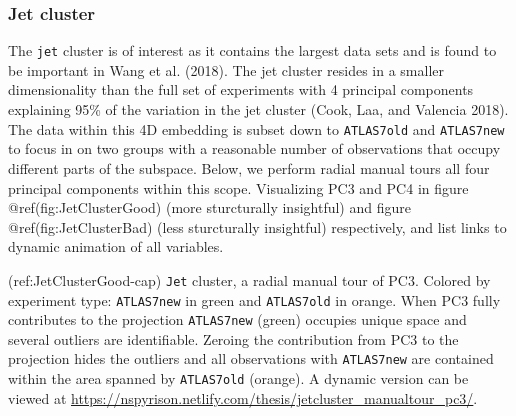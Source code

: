 \hypertarget{jet-cluster}{%
\subsubsection{Jet cluster}\label{jet-cluster}}

The \texttt{jet} cluster is of interest as it contains the largest data sets and is found to be important in Wang et al. (2018). The jet cluster resides in a smaller dimensionality than the full set of experiments with 4 principal components explaining 95\% of the variation in the jet cluster (Cook, Laa, and Valencia 2018). The data within this 4D embedding is subset down to \texttt{ATLAS7old} and \texttt{ATLAS7new} to focus in on two groups with a reasonable number of observations that occupy different parts of the subspace. Below, we perform radial manual tours all four principal components within this scope. Visualizing PC3 and PC4 in figure @ref(fig:JetClusterGood) (more sturcturally insightful) and figure @ref(fig:JetClusterBad) (less sturcturally insightful) respectively, and list links to dynamic animation of all variables.

(ref:JetClusterGood-cap) \texttt{Jet} cluster, a radial manual tour of PC3. Colored by experiment type: \texttt{ATLAS7new} in green and \texttt{ATLAS7old} in orange. When PC3 fully contributes to the projection \texttt{ATLAS7new} (green) occupies unique space and several outliers are identifiable. Zeroing the contribution from PC3 to the projection hides the outliers and all observations with \texttt{ATLAS7new} are contained within the area spanned by \texttt{ATLAS7old} (orange). A dynamic version can be viewed at \url{https://nspyrison.netlify.com/thesis/jetcluster_manualtour_pc3/}.

